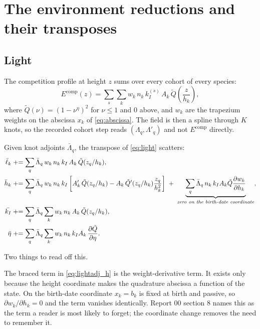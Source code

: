 \documentclass[11pt,a4paper]{article}
\newcommand{\adj}[1]{\bar{#1}}
\newcommand{\dd}[2]{\frac{\partial #1}{\partial #2}}
\begin{document}
\section{The environment reductions and their transposes}
\label{sec:reductions}

\subsection{Light}

The competition profile at height $z$ sums over every cohort of every species:
\begin{equation}
E^{\mathrm{comp}}(z) = \sum_s \sum_k w_k \, n_k \, k_I^{(s)} \, A_k \,
\tilde{Q}\!\left(\frac{z}{h_k}\right),
\label{eq:light}
\end{equation}
where $\tilde{Q}(\nu) = (1 - \nu^{\eta})^2$ for $\nu \le 1$ and $0$ above, and
$w_k$ are the trapezium weights on the abscissa $x_k$ of \eqref{eq:abscissa}. The
field is then a spline through $K$ knots, so the recorded cohort step reads
$(\Lambda_q, \Lambda'_q)$ and not $E^{\mathrm{comp}}$ directly.

Given knot adjoints $\adj\Lambda_q$, the transpose of \eqref{eq:light} scatters:
\begin{align}
\adj\ell_k &\mathrel{+}= \sum_q \adj\Lambda_q \, w_k \, n_k \, k_I \, A_k \,
  \tilde{Q}(z_q/h_k),
\label{eq:lightadj_ell}\\
\adj h_k &\mathrel{+}= \sum_q \adj\Lambda_q \, w_k \, n_k \, k_I
  \left[ A_k' \, \tilde{Q}(z_q/h_k)
        - A_k \, \tilde{Q}'(z_q/h_k) \frac{z_q}{h_k^2} \right]
  \;+\; \underbrace{\sum_q \adj\Lambda_q \, n_k \, k_I A_k \tilde{Q}
        \dd{w_k}{h_k}}_{\text{\emph{zero on the birth-date coordinate}}},
\label{eq:lightadj_h}\\
\adj{k_I} &\mathrel{+}= \sum_q \adj\Lambda_q \sum_k w_k \, n_k \, A_k \,
  \tilde{Q}(z_q/h_k),
\label{eq:lightadj_kI}\\
\adj\eta &\mathrel{+}= \sum_q \adj\Lambda_q \sum_k w_k \, n_k \, k_I A_k \,
  \dd{\tilde{Q}}{\eta} .
\label{eq:lightadj_eta}
\end{align}

Two things to read off this.

The braced term in \eqref{eq:lightadj_h} is the weight-derivative term. It exists
only because the height coordinate makes the quadrature abscissa a function of the
state. On the birth-date coordinate $x_k = b_k$ is fixed at birth and passive, so
$\partial w_k/\partial h_k = 0$ and the term vanishes identically. Report 00
section 8 names this as the term a reader is most likely to forget; the coordinate
change removes the need to remember it.
\end{document}
